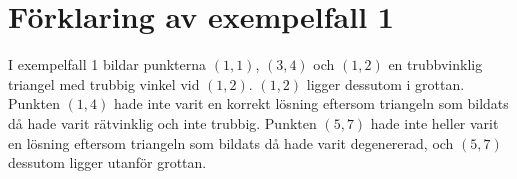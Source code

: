 \section*{Förklaring av exempelfall 1}
I exempelfall 1 bildar punkterna $(1,1)$, $(3,4)$ och $(1,2)$ en trubbvinklig triangel med trubbig vinkel vid $(1,2)$. $(1,2)$ ligger dessutom i grottan. Punkten $(1,4)$ hade inte varit en korrekt lösning eftersom triangeln som bildats då hade varit rätvinklig och inte trubbig. Punkten $(5,7)$ hade inte heller varit en lösning eftersom triangeln som bildats då hade varit degenererad, och $(5,7)$ dessutom ligger utanför grottan.

